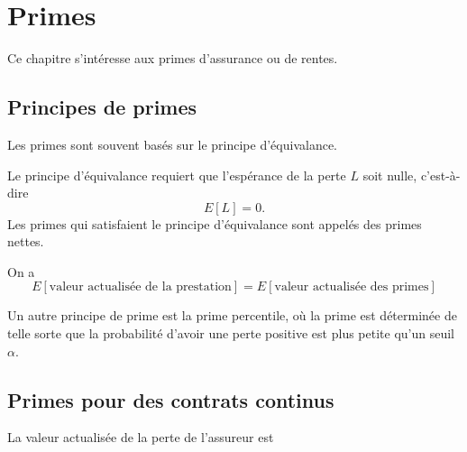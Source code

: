 \chapter{Primes}

Ce chapitre s'intéresse aux primes d'assurance ou de rentes. 

\section{Principes de primes}

Les primes sont souvent basés sur le principe d'équivalance. 

\begin{definition}{}{}
	Le principe d'équivalance requiert que l'espérance de la perte $L$ soit nulle, c'est-à-dire
	$$E[L] = 0.$$
	Les primes qui satisfaient le principe d'équivalance sont appelés des primes nettes. 
	
	On a 
	$$E[\text{valeur actualisée de la prestation}] = E[\text{valeur actualisée des primes}]$$
\end{definition}

Un autre principe de prime est la prime percentile, où la prime est déterminée de telle sorte que la probabilité d'avoir une perte positive est plus petite qu'un seuil $\alpha$. 

\section{Primes pour des contrats continus}

La valeur actualisée de la perte de l'assureur est 




























